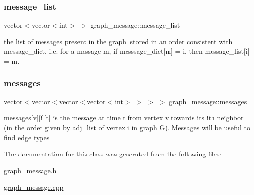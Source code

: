 \mbox{\label{classgraph__message_aa497f561e976cf58cc554a77e0601d8f}} 
\subsubsection{\texorpdfstring{message\+\_\+list}{message\_list}}
{\footnotesize\ttfamily vector$<$vector$<$int$>$ $>$ graph\+\_\+message\+::message\+\_\+list}



the list of messages present in the graph, stored in an order consistent with message\+\_\+dict, i.\+e. for a message m, if messsage\+\_\+dict\mbox{[}m\mbox{]} = i, then message\+\_\+list\mbox{[}i\mbox{]} = m. 

\mbox{\label{classgraph__message_a06a1d1ab91b4891c65ea80205566f800}} 
\subsubsection{\texorpdfstring{messages}{messages}}
{\footnotesize\ttfamily vector$<$vector$<$vector$<$vector$<$int$>$ $>$ $>$ $>$ graph\+\_\+message\+::messages}



messages\mbox{[}v\mbox{]}\mbox{[}i\mbox{]}\mbox{[}t\mbox{]} is the message at time t from vertex v towards its ith neighbor (in the order given by adj\+\_\+list of vertex i in graph G). Messages will be useful to find edge types 



The documentation for this class was generated from the following files\+:\begin{DoxyCompactItemize}
\item 
\hyperlink{graph__message_8h}{graph\+\_\+message.\+h}\item 
\hyperlink{graph__message_8cpp}{graph\+\_\+message.\+cpp}\end{DoxyCompactItemize}
